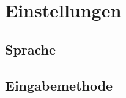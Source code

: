 \chapter{Einstellungen}
\label{chap:settings}

	\section{Sprache}
	\label{sec:lang}
	
	\section{Eingabemethode}
	\label{sec:input}